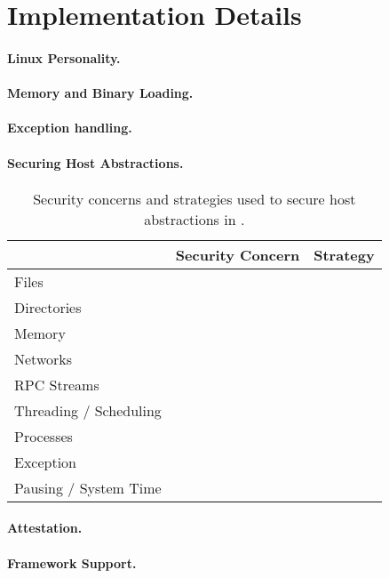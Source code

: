 \section{Implementation Details}

\paragraph{Linux Personality.}

\paragraph{Memory and Binary Loading.}

\paragraph{Exception handling.}

\paragraph{Securing Host Abstractions.}

\begin{table}
\footnotesize
\centering
\begin{tabular}{|>{\raggedright\arraybackslash}p{1in}|>{\raggedright\arraybackslash}p{2.5in}|>{\raggedright\arraybackslash}p{2.5in}|}
\hline
{\bf Abstraction} & {\bf Security Concern} & {\bf Strategy} \\
\hline
Files &
&
\\
\hline
Directories &
&
\\
\hline
Memory &
&
\\
\hline
Networks &
&
\\
\hline
RPC Streams &
&
\\
\hline
Threading / Scheduling &
&
\\
\hline
Processes &
&
\\
\hline
Exception &
&
\\
\hline
Pausing / System Time &
&
\\
\hline
\end{tabular}
\caption[Securig host abstractions in \sysname{}]
{Security concerns and strategies used to secure host abstractions in \sysname{}.}
\label{tab:gsgx:secure}
\end{table}

\paragraph{Attestation.}

\paragraph{Framework Support.}


